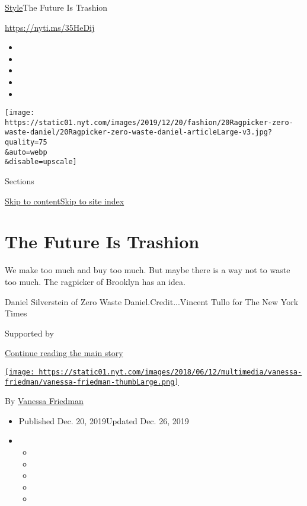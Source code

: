 \href{/section/style}{Style}\textbar{}The Future Is Trashion

\url{https://nyti.ms/35HeDij}

\begin{itemize}
\item
\item
\item
\item
\item
\end{itemize}

\texttt{[image: https://static01.nyt.com/images/2019/12/20/fashion/20Ragpicker-zero-waste-daniel/20Ragpicker-zero-waste-daniel-articleLarge-v3.jpg?quality=75\\\&auto=webp\\\&disable=upscale]}

Sections

\protect\hyperlink{site-content}{Skip to
content}\protect\hyperlink{site-index}{Skip to site index}

\hypertarget{the-future-is-trashion}{%
\section{The Future Is Trashion}\label{the-future-is-trashion}}

We make too much and buy too much. But maybe there is a way not to waste
too much. The ragpicker of Brooklyn has an idea.

Daniel Silverstein of Zero Waste Daniel.Credit...Vincent Tullo for The
New York Times

Supported by

\protect\hyperlink{after-sponsor}{Continue reading the main story}

\href{https://www.nytimes.com/by/vanessa-friedman}{\texttt{[image: https://static01.nyt.com/images/2018/06/12/multimedia/vanessa-friedman/vanessa-friedman-thumbLarge.png]}}

By \href{https://www.nytimes.com/by/vanessa-friedman}{Vanessa Friedman}

\begin{itemize}
\item
  Published Dec. 20, 2019Updated Dec. 26, 2019
\item
  \begin{itemize}
  \item
  \item
  \item
  \item
  \item
  \end{itemize}
\end{itemize}

